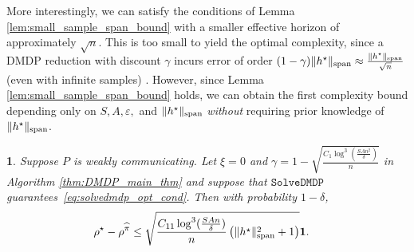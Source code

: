 \documentclass{article}
\theoremstyle{plain}
\newtheorem{thm}{\protect\theoremname}
\theoremstyle{plain}
\theoremstyle{remark}
\theoremstyle{plain}
\theoremstyle{plain}
\providecommand{\theoremname}{Theorem}
\newcommand{\one}{\mathbf{1}}
\newcommand{\pihat}{\widehat{\pi}}
\newcommand{\SolveDMDP}{\texttt{SolveDMDP}}
\begin{document}
More interestingly, we can satisfy the conditions of Lemma \ref{lem:small_sample_span_bound} with a smaller effective horizon of approximately $\sqrt{n}$. This is too small to yield the optimal complexity, since a DMDP reduction with discount $\gamma$ incurs error of order $(1-\gamma)\Vert h^\star\Vert _{\textnormal{span}} \approx \frac{\Vert h^\star\Vert _{\textnormal{span}}}{\sqrt{n}}$ (even with infinite samples) \citep{wang_near_2022}. However, since Lemma \ref{lem:small_sample_span_bound} holds, we can obtain the first complexity bound depending only on $S, A, \varepsilon,$ and $\Vert h^\star\Vert _{\textnormal{span}}$ \textit{without} requiring prior knowledge of $\Vert h^\star\Vert _{\textnormal{span}}$.
\begin{thm}
\label{thm:span_based_without_knowledge}
    Suppose $P$ is weakly communicating. Let $\xi = 0$ and $\gamma = 1 - \sqrt{\frac{C_1 \log^3(\frac{SAn^2}{\delta})}{n}}$ in Algorithm \ref{thm:DMDP_main_thm} and suppose that $\SolveDMDP$ guarantees~\eqref{eq:solvedmdp_opt_cond}. Then with probability $1 - \delta$,
    \begin{align*}
        \rho^\star - \rho^{\pihat} & \leq \sqrt{\frac{C_{11}\log^3(\frac{SAn}{\delta})}{n} \left( \spannorm{h^\star}^2 + 1\right)} \one.
    \end{align*}
\end{thm}
\end{document}
